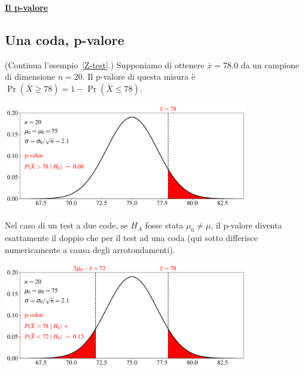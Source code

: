 \documentclass[11pt,openany]{book}
\begin{document}

\clearpage
\hfill\textbf{{\color{brown}\hyperref[pvalore]{Il p-valore \faShare}}}
\subsection{Una coda, p-valore}
(Continua l'esempio~\ref{Z-test}.) Supponiamo di ottenere $\bar x=78.0$ da un campione di dimensione $n=20$. Il p-valore di questa misura è $\Pr(\bar X\ge 78)=1-\Pr(\bar X\le 78)$.

\hfil\includegraphics[width=0.8\textwidth]{figure/Z-test-p-val_01.pdf}

Nel caso di un test a due code, se $H_A$ fosse stata $\mu_0\neq\mu$, il p-valore diventa esattamente il doppio che per il test ad una coda (qui sotto differisce numericamente a causa degli arrotondamenti). 

\hfil\includegraphics[width=0.8\textwidth]{figure/Z-test-p-val_02.pdf}
\end{document}
